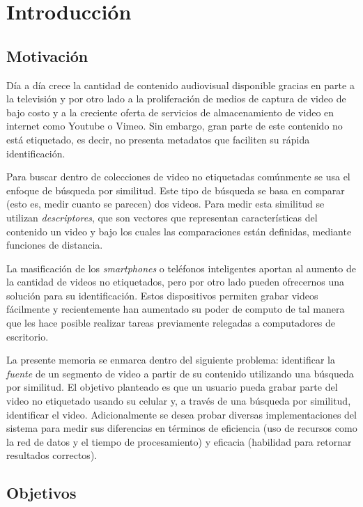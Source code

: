 \chapter{Introducción} \label{intro}

\section{Motivación} \label{motivacion}

Día a día crece la cantidad de contenido audiovisual disponible gracias en parte a la televisión y por otro lado a la proliferación de medios de captura de video de bajo costo y a la creciente oferta de servicios de almacenamiento de video en internet como Youtube o Vimeo.
Sin embargo, gran parte de este contenido no está etiquetado, es decir, no presenta metadatos que faciliten su rápida identificación. 

Para buscar dentro de colecciones de video no etiquetadas comúnmente se usa el enfoque de búsqueda por similitud. Este tipo de búsqueda se basa en comparar (esto es, medir cuanto se parecen) dos videos. Para medir esta similitud se utilizan \emph{descriptores}, que son vectores que representan características del contenido un video y bajo los cuales las comparaciones están definidas, mediante funciones de distancia.

La masificación de los \emph{smartphones} o teléfonos inteligentes aportan al aumento de la cantidad de videos no etiquetados, pero por otro lado pueden ofrecernos una solución para su identificación. Estos dispositivos permiten grabar videos fácilmente y recientemente han aumentado su poder de computo de tal manera que les hace posible realizar tareas previamente relegadas a computadores de escritorio.

La presente memoria se enmarca dentro del siguiente problema: identificar la \emph{fuente} de un segmento de video a partir de su contenido utilizando una búsqueda por similitud. El objetivo planteado es que un usuario pueda grabar parte del video no etiquetado usando su celular y, a través de una búsqueda por similitud, identificar el video. 
Adicionalmente se desea probar diversas implementaciones del sistema para medir sus diferencias en términos de eficiencia (uso de recursos como la red de datos y el tiempo de procesamiento) y eficacia (habilidad para retornar resultados correctos).

\section{Objetivos} \label{objetivos}

